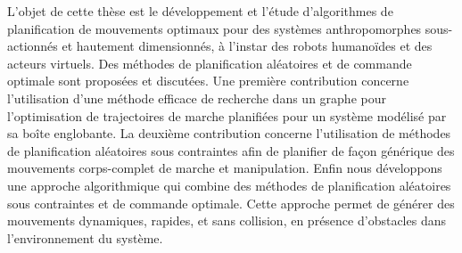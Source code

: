 \begin{resume}
L'objet de cette th\`ese est le d\'eveloppement et l'\'etude
d'algorithmes de planification de mouvements optimaux pour des
syst\`emes anthropomorphes sous-actionn\'es et hautement
dimensionn\'es, \`a l'instar des robots humano\"ides et des acteurs
virtuels. Des m\'ethodes de planification al\'eatoires et de commande
optimale sont propos\'ees et discut\'ees. Une premi\`ere contribution
concerne l'utilisation d'une m\'ethode efficace de recherche dans un
graphe pour l'optimisation de trajectoires de marche planifi\'ees pour
un syst\`eme mod\'elis\'e par sa bo\^ite englobante. La deuxi\`eme
contribution concerne l'utilisation de m\'ethodes de planification
al\'eatoires sous contraintes afin de planifier de fa\c{c}on
g\'en\'erique des mouvements corps-complet de marche et
manipulation. Enfin nous d\'eveloppons une approche algorithmique qui
combine des m\'ethodes de planification al\'eatoires sous contraintes
et de commande optimale. Cette approche permet de g\'en\'erer des
mouvements dynamiques, rapides, et sans collision, en pr\'esence
d'obstacles dans l'environnement du syst\`eme.
\end{resume}
